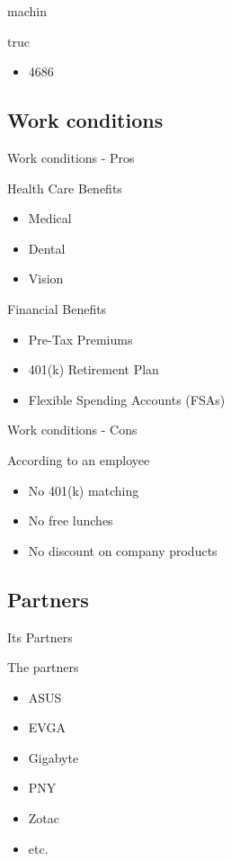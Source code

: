 \documentclass{beamer}
\begin{document}
\begin{frame}{machin}
	\begin{block}{truc}
		\begin{itemize}
			\item<+->{4686}
		\end{itemize}
	\end{block}
\end{frame}

\subsection{Work conditions}
\begin{frame}{Work conditions - Pros}

	\begin{block}{Health Care Benefits}
		\begin{itemize}
			\item<+->{Medical}
			\item<+->{Dental}
			\item<+->{Vision}
		\end{itemize}
	\end{block}
	\begin{block}{Financial Benefits}
		\begin{itemize}
			\item<+->{Pre-Tax Premiums}
			\item<+->{401(k) Retirement Plan}
			\item<+->{Flexible Spending Accounts (FSAs)}
		\end{itemize}
	\end{block}
	
\end{frame}

\begin{frame}{Work conditions - Cons}
	\begin{block}{According to an employee}
		\begin{itemize}
			\item<+->{No 401(k) matching}
			\item<+->{No free lunches}
			\item<+->{No discount on company products}
		\end{itemize}
	\end{block}
\end{frame}

\subsection{Partners}
\begin{frame}{Its Partners}
	\begin{block}{The partners}
		\begin{itemize}
			\item<+->{ASUS}
			\item<+->{EVGA}
			\item<+->{Gigabyte}
			\item<+->{PNY}
			\item<+->{Zotac}
			\item<+->{etc.}
		\end{itemize}
	\end{block}
\end{frame}
\end{document}
